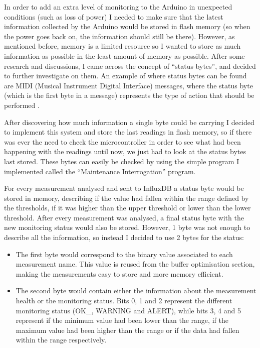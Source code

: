 \documentclass[12pt]{article}
\begin{document}
In order to add an extra level of monitoring to the Arduino in unexpected conditions (such as loss of power) I needed to make sure that the latest information collected by the Arduino would be stored in flash memory (so when the power goes back on, the information should still be there). However, as mentioned before, memory is a limited resource so I wanted to store as much information as possible in the least amount of memory as possible. After some research and discussions, I came across the concept of ``status bytes'', and decided to further investigate on them. An example of where status bytes can be found are MIDI (Musical Instrument Digital Interface) messages, where the status byte (which is the first byte in a message) represents the type of action that should be performed \cite{recording-blogs} \cite{midi}. \par 

After discovering how much information a single byte could be carrying I decided to implement this system and store the last readings in flash memory, so if there was ever the need to check the microcontroller in order to see what had been happening with the readings until now, we just had to look at the status bytes last stored. These bytes can easily be checked by using the simple program I implemented called the ``Maintenance Interrogation'' program. \par 

For every measurement analysed and sent to InfluxDB a status byte would be stored in memory, describing if the value had fallen within the range defined by the thresholds, if it was higher than the upper threshold or lower than the lower threshold. After every measurement was analysed, a final status byte with the new monitoring status would also be stored. However, 1 byte was not enough to describe all the information, so instead I decided to use 2 bytes for the status:
\begin{itemize}
    \item The first byte would correspond to the binary value associated to each measurement name. This value is reused from the buffer optimisation section, making the measurements easy to store and more memory efficient.
    \item The second byte would contain either the information about the measurement health or the monitoring status. Bits 0, 1 and 2 represent the different monitoring status (OK\_, WARNING and ALERT), while bits 3, 4 and 5 represent if the minimum value had been lower than the range, if the maximum value had been higher than the range or if the data had fallen within the range respectively. 
\end{itemize}
\end{document}
